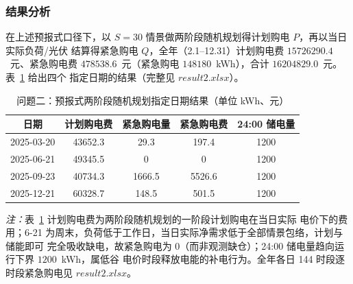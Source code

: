 \documentclass[withoutpreface]{cumcmthesis}
\begin{document}
\subsubsection{结果分析}
在上述预报式口径下，以 $S=30$ 情景做两阶段随机规划得计划购电 $P$，再以当日实际负荷/光伏
结算得紧急购电 $Q$，全年（2.1--12.31）计划购电费 $15726290.4$~元、紧急购电费
$478538.6$~元（紧急购电 $148180$~kWh），合计 $16204829.0$~元。表~\ref{tab:q2} 给出四个
指定日期的结果（完整见 $result2.xlsx$）。
\begin{table}[H]
    \centering
    \caption{问题二：预报式两阶段随机规划指定日期结果（单位 kWh、元）}\label{tab:q2}
    \begin{tabular}{ccccc}
        \toprule[0.8pt]
        日期 & 计划购电费 & 紧急购电量 & 紧急购电费 & 24:00 储电量 \\
        \midrule[0.5pt]
        2025-03-20 & 43652.3 & 29.3 & 197.4 & 1200 \\
        2025-06-21 & 49345.5 & 0 & 0 & 1200 \\
        2025-09-23 & 40734.3 & 1666.5 & 5526.6 & 1200 \\
        2025-12-21 & 60328.7 & 148.5 & 501.5 & 1200 \\
        \bottomrule[0.8pt]
    \end{tabular}
\end{table}
\noindent\textit{注：}表~\ref{tab:q2} 计划购电费为两阶段随机规划的一阶段计划购电在当日实际
电价下的费用；6-21 为周末，负荷低于工作日，当日实际净需求低于全部情景包络，计划与储能即可
完全吸收缺电，故紧急购电为 0（而非观测缺仓）；24:00 储电量趋向运行下界 $1200$~kWh，属低谷
电价时段释放电能的补电行为。全年各日 144 时段逐时段紧急购电见 $result2.xlsx$。
\end{document}
